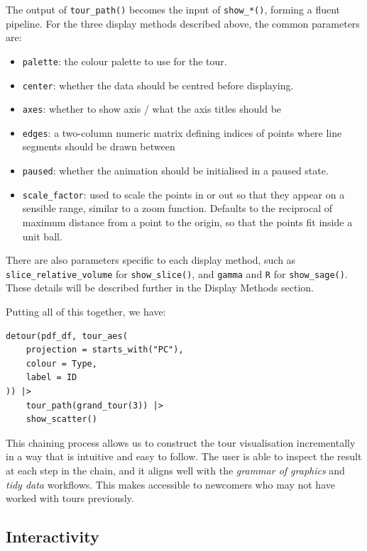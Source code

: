 The output of \texttt{tour\_path()} becomes the input of \texttt{show\_*()}, forming a fluent pipeline. For the three display methods described above, the common parameters are:

\begin{itemize}
\tightlist
\item
  \texttt{palette}: the colour palette to use for the tour.
\item
  \texttt{center}: whether the data should be centred before displaying.
\item
  \texttt{axes}: whether to show axis / what the axis titles should be
\item
  \texttt{edges}: a two-column numeric matrix defining indices of points where line segments should be drawn between
\item
  \texttt{paused}: whether the animation should be initialised in a paused state.
\item
  \texttt{scale\_factor}: used to scale the points in or out so that they appear on a sensible range, similar to a zoom function. Defaults to the reciprocal of maximum distance from a point to the origin, so that the points fit inside a unit ball.
\end{itemize}

There are also parameters specific to each display method, such as \texttt{slice\_relative\_volume} for \texttt{show\_slice()}, and \texttt{gamma} and \texttt{R} for \texttt{show\_sage()}. These details will be described further in the Display Methods section.

\pagebreak

Putting all of this together, we have:

\begin{verbatim}
detour(pdf_df, tour_aes(
    projection = starts_with("PC"),
    colour = Type,
    label = ID
)) |>
    tour_path(grand_tour(3)) |>
    show_scatter()
\end{verbatim}

This chaining process allows us to construct the tour visualisation incrementally in a way that is intuitive and easy to follow. The user is able to inspect the result at each step in the chain, and it aligns well with the \emph{grammar of graphics} and \emph{tidy data} workflows. This makes  accessible to newcomers who may not have worked with tours previously.

\hypertarget{interactivity}{%
\subsection{Interactivity}\label{interactivity}}

